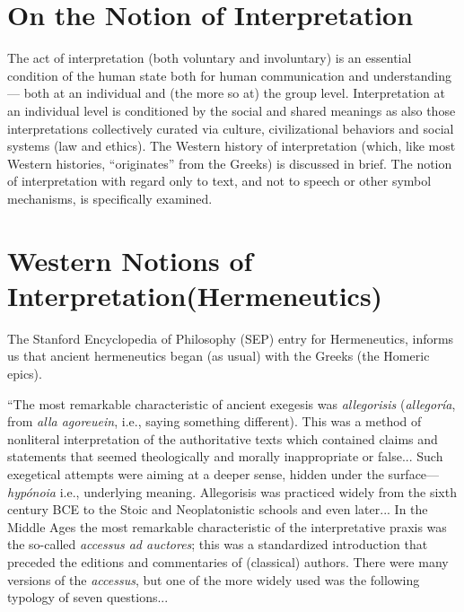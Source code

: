 \section*{On the Notion of Interpretation}

The act of interpretation (both voluntary and involuntary) is an essential condition of the human state both for human communication and understanding — both at an individual and (the more so at) the group level. Interpretation at an individual level is conditioned by the social and shared meanings as also those interpretations collectively curated via culture, civilizational behaviors and social systems (law and ethics). The Western history of interpretation (which, like most Western histories, “originates” from the Greeks) is discussed in brief. The notion of interpretation with regard only to text, and not to speech or other symbol mechanisms, is specifically examined.


\section*{Western Notions of Interpretation\hfil \break (Hermeneutics)}

The Stanford Encyclopedia of Philosophy (SEP) entry for Herme\-neutics, informs us that ancient hermeneutics began (as usual) with the Greeks (the Homeric epics).

\begin{myquote}
“The most remarkable characteristic of ancient exegesis was \textit{allegorisis} (\textit{allegoría}, from \textit{alla agoreuein}, i.e., saying something different). This was a method of nonliteral interpretation of the authoritative texts which contained claims and statements that seemed theologically and morally inappropriate or false... Such exegetical attempts were aiming at a deeper sense, hidden under the surface—\textit{hypónoia} i.e., underlying meaning. Allegorisis was practiced widely from the sixth century BCE to the Stoic and Neoplatonistic schools and even later... In the Middle Ages the most remarkable characteristic of the interpretative praxis was the so-called \textit{accessus ad auctores}; this was a standardized introduction that preceded the editions and commentaries of (classical) authors. There were many versions of the \textit{accessus}, but one of the more widely used was the following typology of seven questions...
\end{myquote}

